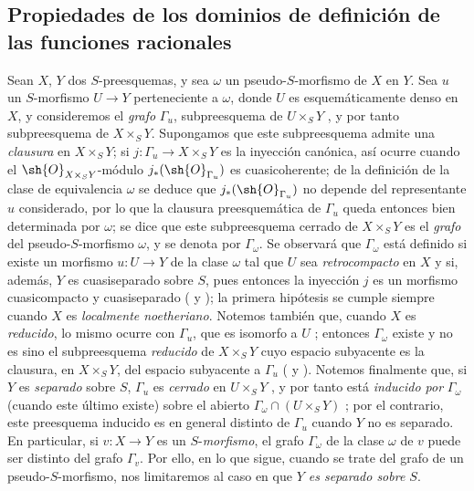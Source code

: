 \subsection{Propiedades de los dominios de definición de las funciones racionales}
\label{IV.20.4}

\begin{env}[20.4.1]
\label{IV.20.4.1}
Sean $X$, $Y$ dos $S$-preesquemas, y sea $\omega$ un pseudo-$S$-morfismo de $X$ en $Y$.
Sea $u$ un $S$-morfismo $U\to Y$ perteneciente a $\omega$, donde $U$ es esquemáticamente denso en $X$, y consideremos el \emph{grafo} $\Gamma_u$, subpreesquema de $U\times_S Y$ , y por tanto subpreesquema de $X\times_S Y$.
Supongamos que este subpreesquema admite una \emph{clausura}  en $X\times_S Y$; si $j:\Gamma_u\to X\times_S Y$ es la inyección canónica, así ocurre cuando el $\sh{O}_{X\times_S Y}$-módulo $j_*(\sh{O}_{\Gamma_u})$ es cuasicoherente; de la definición de la clase de equivalencia $\omega$  se deduce que $j_*(\sh{O}_{\Gamma_u})$ no depende del representante $u$ considerado, por lo que la clausura preesquemática de $\Gamma_u$ queda entonces bien determinada por $\omega$; se dice que este subpreesquema cerrado de $X\times_S Y$ es el \emph{grafo} del pseudo-$S$-morfismo $\omega$, y se denota por $\Gamma_\omega$.
Se observará que $\Gamma_\omega$ está definido si existe un morfismo $u:U\to Y$ de la clase $\omega$ tal que $U$ sea \emph{retrocompacto} en $X$ y si, además, $Y$ es cuasiseparado sobre $S$, pues entonces la inyección $j$ es un morfismo cuasicompacto y cuasiseparado ( y ); la primera hipótesis se cumple siempre cuando $X$ es \emph{localmente noetheriano}.
Notemos también que, cuando $X$ es \emph{reducido}, lo mismo ocurre con $\Gamma_u$, que es isomorfo a $U$ ; entonces $\Gamma_\omega$ existe y no es sino el subpreesquema \emph{reducido} de $X\times_S Y$ cuyo espacio subyacente es la clausura, en $X\times_S Y$, del espacio subyacente a $\Gamma_u$ ( y ).
Notemos finalmente que, si $Y$ es \emph{separado} sobre $S$, $\Gamma_u$ es \emph{cerrado} en $U\times_S Y$ , y por tanto está \emph{inducido por} $\Gamma_\omega$ (cuando este último existe) sobre el abierto $\Gamma_\omega\cap(U\times_S Y)$ ; por el contrario, este preesquema inducido es en general distinto de $\Gamma_u$ cuando $Y$ no es separado.
En particular, si $v:X\to Y$ es un $S$-\emph{morfismo}, el grafo $\Gamma_\omega$ de la clase $\omega$ de $v$ puede ser distinto del grafo $\Gamma_v$.
Por ello, en lo que sigue, cuando se trate del grafo de un pseudo-$S$-morfismo, nos limitaremos al caso en que \emph{$Y$ es separado sobre $S$}.
\end{env}


